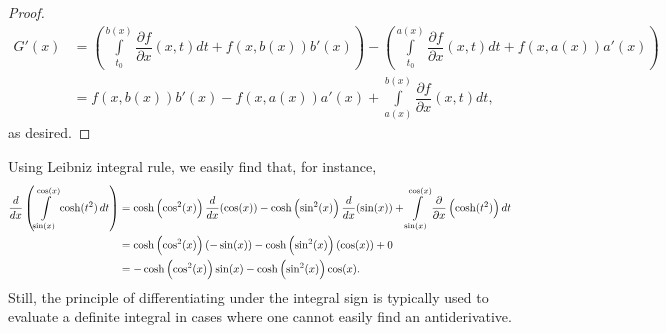 \begin{proof}
$$
\displaystyle {\begin{aligned}G'(x)&=\left(\int\limits _{t_{0}}^{b(x)}{\dfrac {\partial f}{\partial x}}(x,t)dt+f\left(x,b(x)\right)b'(x)\right)-\left(\int\limits _{t_{0}}^{a(x)}{\dfrac {\partial f}{\partial x}}(x,t)dt+f\left(x,a(x)\right)a'(x)\right)\\[0.2cm]
&=f\left(x,b(x)\right)b'(x)-f\left(x,a(x)\right)a'(x)+\int\limits _{a(x)}^{b(x)}{\dfrac {\partial f}{\partial x}}(x,t)dt,\end{aligned}}
$$
as desired. 
\end{proof}

\pagebreak
\begin{example}
Using Leibniz integral rule, we easily find that, for instance,
$$
\allowdisplaybreaks
\begin{aligned}{\frac {d}{dx}}\left(\int\limits _{\sin (x)}^{\cos (x)}\cosh (t^{2})\,dt\right)&=\cosh \left(\cos ^{2}(x)\right){\frac {d}{dx}}(\cos (x))-\cosh \left(\sin ^{2}(x)\right){\frac {d}{dx}}(\sin (x))+\int\limits _{\sin (x)}^{\cos (x)}{\frac {\partial }{\partial x}}\left(\cosh (t^{2})\right)dt\\&=\cosh \left(\cos ^{2}(x)\right)(-\sin (x))-\cosh \left(\sin ^{2}(x)\right)(\cos (x))+0\\&=-\cosh \left(\cos ^{2}(x)\right)\sin (x)-\cosh \left(\sin ^{2}(x)\right)\cos (x).\end{aligned}
$$
Still, the principle of differentiating under the integral sign is typically used to evaluate a definite integral in cases where one cannot easily find an antiderivative.
\end{example}



